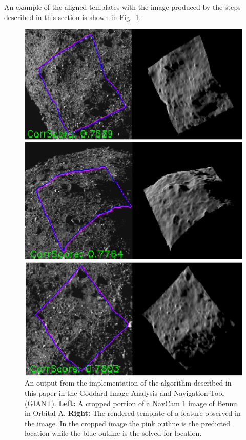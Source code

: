 \documentclass{src/RPI-SIW}
\begin{document}
An example of the aligned templates with the image produced by the steps described in this section is shown in Fig.~\ref{fig:sample_template}.
\begin{figure}
	\centering
	\includegraphics[width=\columnwidth]{figs/sfn_sample2.png}
    \caption{An output from the implementation of the algorithm described in this paper in the Goddard Image Analysis and Navigation Tool (GIANT). \textbf{Left:} A cropped portion of a NavCam 1\cite{tagcams} image of Bennu in Orbital A. \textbf{Right:} The rendered template of a feature observed in the image.  In the cropped image the pink outline is the predicted location while the blue outline is the solved-for location.}
	\label{fig:sample_template}
\end{figure}
\end{document}
